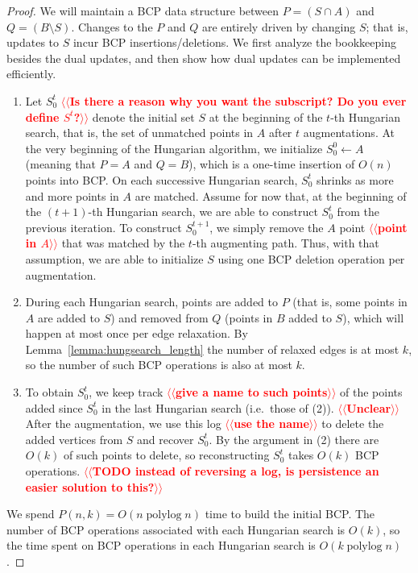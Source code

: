 \documentclass[11pt]{article}
\makeatletter
\def\polylog{\mathop{\mathrm{polylog}}}
\theoremstyle{plain}
\numberwithin{figure}{section}
\def\n@te#1{\textsf{\boldmath \textbf{$\langle\!\langle$#1$\rangle\!\rangle$}}\leavevmode}
\def\note#1{\textcolor{red}{\n@te{#1}}}
\makeatother
\begin{document}
\begin{proof}
We will maintain a BCP data structure between $P = (S \cap A)$ and
$Q = (B \setminus S)$.
Changes to the $P$ and $Q$ are entirely driven by changing $S$; that is,
updates to $S$ incur BCP insertions/deletions.
We first analyze the bookkeeping besides the dual updates, and then
show how dual updates can be implemented efficiently.

\begin{enumerate}
\item Let $S^t_0$ \note{Is there a reason why you want the subscript?  Do you ever define $S^t$?} denote the initial set $S$ at the beginning of the
	$t$-th Hungarian search, that is, the set of unmatched points in $A$
	after $t$ augmentations.
	At the very beginning of the Hungarian algorithm, we initialize
	$S^0_0 \gets A$ (meaning that $P = A$ and $Q = B$), which is a
	one-time insertion of $O(n)$ points into BCP.
	On each successive Hungarian search, $S^t_0$ shrinks as more
	and more points in $A$ are matched.
	Assume for now that, at the beginning of the $(t+1)$-th
	Hungarian search, we are able to construct $S^t_0$ from the
	previous iteration.
	To construct $S^{t+1}_0$, we simply remove the $A$ point \note{point in $A$} that
	was matched by the $t$-th augmenting path.
	Thus, with that assumption, we are able to initialize $S$ using
	one BCP deletion operation per augmentation.

\item During each Hungarian search, points are added to $P$ (that is, some points in $A$ are
	added to $S$) and removed from $Q$ (points in $B$ added to $S$), which will happen at most once per edge relaxation.
	By Lemma~\ref{lemma:hungsearch_length} the number of relaxed
	edges is at most $k$, so the number of such BCP operations is
	also at most $k$.

\item To obtain $S^t_0$, we keep track \note{give a name to such points} of the
	points added since $S^t_0$ in the last Hungarian search
	(i.e.\ those of (2)). \note{Unclear}
	After the augmentation, we use this log \note{use the name} to delete the added
	vertices from $S$ and recover $S^t_0$.
	By the argument in (2) there are $O(k)$ of such points to
	delete, so reconstructing $S^t_0$ takes $O(k)$ BCP operations.
	\note{TODO instead of reversing a log, is persistence an easier solution to this?}
\end{enumerate}

We spend $P(n, k) = O(n \polylog n)$ time to build the initial BCP.
The number of BCP operations associated with each Hungarian search is
$O(k)$, so the time spent on BCP operations in each Hungarian search
is $O(k \polylog n)$.


\end{proof}
\end{document}
